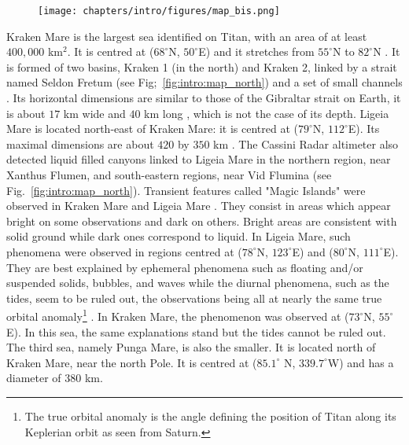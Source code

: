 \begin{figure}
\begin{center}
\texttt{[image: chapters/intro/figures/map\_bis.png]}
~ \\
\end{center}
\end{figure}

 Kraken Mare is the largest sea identified on Titan, with an area of at least $400,000$ km$^2$. It is centred at ($68^\circ$N, $50^\circ$E) \citep{tokano2010simulation} and it stretches from $55^\circ$N to $82^\circ$N \citep{lorenz2014radar}. It is formed of two basins, Kraken 1 (in the north) and Kraken 2, linked by a strait named Seldon Fretum (see Fig;~\ref{fig:intro:map_north}) and a set of small channels \citep{lorenz2014radar}. Its horizontal dimensions are similar to those of the Gibraltar strait on Earth, it is about $17$ km wide and $40$ km long \citep{lorenz2014radar}, which is not the case of its depth. Ligeia Mare is located north-east of Kraken Mare: it is centred at ($79^\circ$N, $112^\circ$E). Its maximal dimensions are about $420$ by $350$ km \citep{stofan2012shorelines}. The Cassini Radar altimeter also detected liquid filled canyons linked to Ligeia Mare in the northern region, near Xanthus Flumen, and south-eastern regions, near Vid Flumina \citep{poggiali2016liquid} (see Fig.~\ref{fig:intro:map_north}). Transient features called "Magic Islands" were observed in Kraken Mare and Ligeia Mare \citep{hofgartner2014transient, hofgartner2016titan}. They consist in areas which appear bright on some observations and dark on others. Bright areas are consistent with solid ground while dark ones correspond to liquid. In Ligeia Mare, such phenomena were observed in regions centred at ($78^\circ$N, $123^\circ$E) and ($80^\circ$N, $111^\circ$E). They are best explained by ephemeral phenomena such as floating and/or suspended solids, bubbles, and waves while the diurnal phenomena, such as the tides, seem to be ruled out, the observations being all at nearly the same true orbital anomaly\footnote{The true orbital anomaly is the angle defining the position of Titan along its Keplerian orbit as seen from Saturn.} \citep{hofgartner2016titan}. In Kraken Mare, the phenomenon was observed at ($73^\circ$N, $55^\circ$E). In this sea, the same explanations stand but the tides cannot be ruled out. The third sea, namely Punga Mare, is also the smaller. It is located north of Kraken Mare, near the north Pole. It is centred at ($85.1^\circ$ N, $339.7^\circ$W) and has a diameter of 380 km. 



